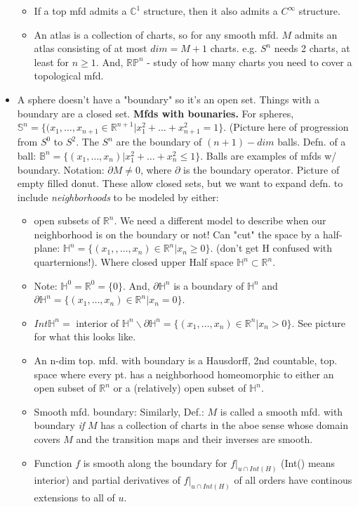 \documentclass[12pt,letterpaper]{article}
\begin{document}
\begin{itemize}
\begin{itemize}
\begin{itemize}
        \end{itemize}
        \item If a top mfd admits a $\mathbb{C}^1$ structure, then it also admits a $C^{\infty}$ structure.
        \item An atlas is a collection of charts, so for any smooth mfd. $M$ admits an atlas consisting of at most $dim=M+1$ charts. e.g. $S^n$ needs 2 charts, at least for $n\geq1$. And, $\mathbb{R}\mathbb{P}^n$ - study of how many charts you need to cover a topological mfd.
    \end{itemize}
    \item A sphere doesn't have a "boundary" so it's an open set. Things with a boundary are a closed set. \textbf{Mfds with bounaries.} For spheres, $\mathbb{S}^n= \{ (x_1, \dots, x_{n+1} \in \mathbb{R}^{n+1}| x_1^2 + \dots + x_{n+1}^2 = 1\}$. (Picture here of progression from $S^0$ to $S^2$. The $S^n$ are the boundary of $(n+1)-dim$ balls. Defn. of a ball: $\mathbb{B}^n = \{ (x_1, \dots, x_n) | x_1^2 + \dots + x_n^2 \leq 1 \}$. Balls are examples of mfds w/ boundary. Notation: $\partial M \neq 0$, where $\partial$ is the boundary operator. Picture of empty filled donut. These allow closed sets, but we want to expand defn. to include \textit{neighborhoods} to be modeled by either:
    \begin{itemize}
        \item open subsets of $\mathbb{R}^n$. We need a different model to describe when our neighborhood is on the boundary or not! Can "cut" the space by a half-plane: $\mathbb{H}^n = \{ ( x_1, ,\dots, x_n) \in \mathbb{R}^n | x_n \geq 0\}$. (don't get H confused with quarternions!). Where closed upper Half space $\mathbb{H}^n \subset \mathbb{R}^n$.
        \item Note: $\mathbb{H}^0 =  \mathbb{R}^0 = \{0\}$. And, $\partial \mathbb{H}^n$ is a boundary of $\mathbb{H}^n$ and $\partial \mathbb{H}^n = \{ ( x_1, \dots, x_n) \in \mathbb{R}^n | x_n = 0\}$.
        \item $Int \mathbb{H}^n =$ interior of $\mathbb{H}^n \backslash \partial \mathbb{H}^n = \{ (x_1, \dots, x_n) \in \mathbb{R}^n | x_n > 0 \}$. See picture for what this looks like.
        \item An n-dim top. mfd. with boundary is a Hausdorff, 2nd countable, top. space where every pt. has a neighborhood homeomorphic to either an open subset of $\mathbb{R}^n$ or a (relatively) open subset of $\mathbb{H}^n$.
        \item Smooth  mfd. boundary: Similarly, Def.: $M$ is called a smooth mfd. with boundary \textit{if} $M$ has a collection of charts in the aboe sense whose domain covers $M$ and the transition maps and their inverses are smooth.
        \item Function $f$ is smooth along the boundary for $f|_{u \cap Int(H)}$ (Int() means interior) and partial derivatives of $f|_{u \cap Int(H)}$ of all orders have continous extensions to all of $u$. 
    \end{itemize}
    
\end{itemize}
\end{document}

